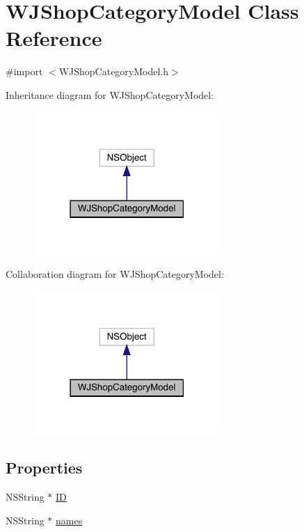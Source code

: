 \hypertarget{interface_w_j_shop_category_model}{}\section{W\+J\+Shop\+Category\+Model Class Reference}
\label{interface_w_j_shop_category_model}


{\ttfamily \#import $<$W\+J\+Shop\+Category\+Model.\+h$>$}



Inheritance diagram for W\+J\+Shop\+Category\+Model\+:\nopagebreak
\begin{figure}[H]
\begin{center}
\leavevmode
\includegraphics[width=202pt]{interface_w_j_shop_category_model__inherit__graph}
\end{center}
\end{figure}


Collaboration diagram for W\+J\+Shop\+Category\+Model\+:\nopagebreak
\begin{figure}[H]
\begin{center}
\leavevmode
\includegraphics[width=202pt]{interface_w_j_shop_category_model__coll__graph}
\end{center}
\end{figure}
\subsection*{Properties}
\begin{DoxyCompactItemize}
\item 
N\+S\+String $\ast$ \mbox{\hyperlink{interface_w_j_shop_category_model_a00566b3eb3e8e96992373630521197d9}{ID}}
\item 
N\+S\+String $\ast$ \mbox{\hyperlink{interface_w_j_shop_category_model_ac15d7fb100b4d11f0f38219134165c57}{names}}
\end{DoxyCompactItemize}


